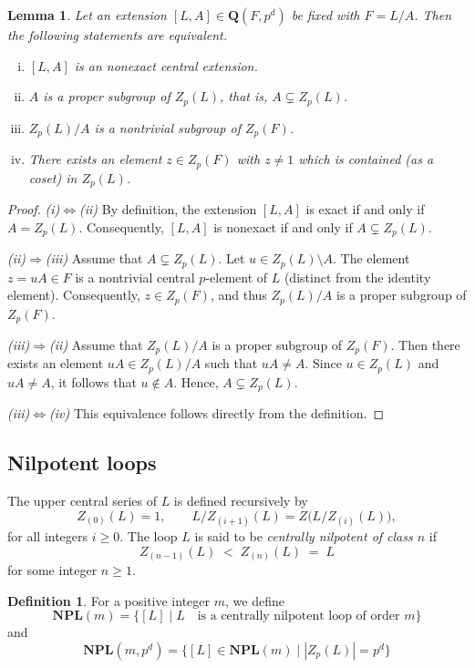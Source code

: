 \documentclass[12pt,a4paper]{amsart}
\newtheorem{lemma}[theorem]{Lemma}
\theoremstyle{definition}
\newtheorem{definition}[theorem]{Definition}
\newcommand{\boldQ}{\mathbf{Q}}
\newcommand{\NPL}{\mathbf{NPL}}
\begin{document}
\begin{lemma}\label{lem:nonexact}
Let an extension $[L, A]\in \boldQ(F,p^d)$ be fixed with $F=L/A$. Then the following statements are equivalent.
\begin{enumerate}[(i)]
\item $[L,A]$ is an nonexact central extension.
\item $A$ is a proper subgroup of $Z_{p}(L)$, that is, $A\subsetneq Z_{p}(L)$.
\item $Z_{p}(L)/A$ is a nontrivial subgroup of $Z_{p}(F)$.
\item There exists an element $z\in Z_{p}(F)$ with $z\neq 1$ which is contained (as a coset) in $Z_{p}(L)$.
\end{enumerate}
\end{lemma}
\begin{proof}
\noindent\textit{(i)$\Longleftrightarrow$(ii)} By definition, the extension $[L,A]$ is exact if and only if $A=Z_p(L)$. Consequently, $[L,A]$ is nonexact if and only if $A\subsetneq Z_{p}(L)$.

\medskip
\noindent\textit{(ii)$\Longrightarrow$(iii)}  
Assume that $A\subsetneq Z_{p}(L)$. Let $u \in Z_p(L)\setminus A$. The element $z = uA \in F$ is a nontrivial central $p$-element of $L$ (distinct from the identity element). Consequently, $z \in Z_p(F)$, and thus $Z_p(L)/A$ is a proper subgroup of $Z_p(F)$.

\medskip
\noindent\textit{(iii)$\Longrightarrow$(ii)}  
Assume that $Z_p(L)/A$ is a proper subgroup of $Z_p(F)$. Then there exists an element $uA \in Z_p(L)/A$ such that $uA \neq A$. Since $u \in Z_p(L)$ and $uA \neq A$, it follows that $u \notin A$. Hence, $A \subsetneq Z_p(L)$.

\medskip
\noindent\textit{(iii)$\iff$(iv)}  
This equivalence follows directly from the definition.
\end{proof}




\subsection{Nilpotent loops}

The upper central series of $L$ is defined recursively by
\[
Z_{(0)}(L) = 1,\qquad L / Z_{(i+1)}(L) = Z\bigl(L / Z_{(i)}(L)\bigr),
\]
for all integers $i \ge 0$. The loop $L$ is said to be \textit{centrally nilpotent of class $n$} if
\[
Z_{(n-1)}(L) \;<\; Z_{(n)}(L) \;=\; L
\]
for some integer $n \ge 1$.
\begin{definition}
 For a positive integer $m$, we define 
 \[
 \NPL(m)=\bigl\{[L] \mid L \quad \text{is a centrally nilpotent loop of order } m \bigr\}
 \]
and 
\[
\NPL(m,p^{d})=\bigl\{[L] \in \NPL(m)\mid |Z_{p}(L)|=p^{d}\bigr\}
\] 
\end{definition}
\end{document}
